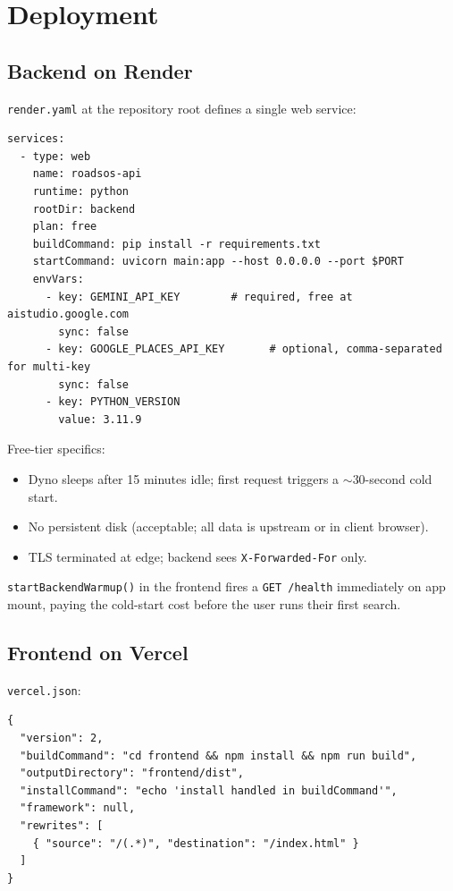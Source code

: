 \documentclass[11pt, a4paper]{article}
\newcommand{\file}[1]{\texttt{\small\color{rsblue}#1}}
\newcommand{\code}[1]{\texttt{\small#1}}
\begin{document}
\section{Deployment}

\subsection{Backend on Render}

\file{render.yaml} at the repository root defines a single web service:

\begin{lstlisting}[language={},caption={render.yaml}]
services:
  - type: web
    name: roadsos-api
    runtime: python
    rootDir: backend
    plan: free
    buildCommand: pip install -r requirements.txt
    startCommand: uvicorn main:app --host 0.0.0.0 --port $PORT
    envVars:
      - key: GEMINI_API_KEY        # required, free at aistudio.google.com
        sync: false
      - key: GOOGLE_PLACES_API_KEY       # optional, comma-separated for multi-key
        sync: false
      - key: PYTHON_VERSION
        value: 3.11.9
\end{lstlisting}

Free-tier specifics:

\begin{itemize}[leftmargin=*, itemsep=2pt, topsep=2pt]
  \item Dyno sleeps after 15 minutes idle; first request triggers a $\sim$30-second cold start.
  \item No persistent disk (acceptable; all data is upstream or in client browser).
  \item TLS terminated at edge; backend sees \code{X-Forwarded-For} only.
\end{itemize}

\code{startBackendWarmup()} in the frontend fires a \code{GET /health} immediately on app mount, paying the cold-start cost before the user runs their first search.

\subsection{Frontend on Vercel}

\file{vercel.json}:

\begin{lstlisting}[caption={vercel.json}]
{
  "version": 2,
  "buildCommand": "cd frontend && npm install && npm run build",
  "outputDirectory": "frontend/dist",
  "installCommand": "echo 'install handled in buildCommand'",
  "framework": null,
  "rewrites": [
    { "source": "/(.*)", "destination": "/index.html" }
  ]
}
\end{lstlisting}
\end{document}

